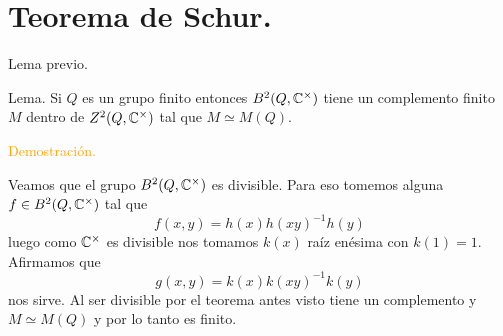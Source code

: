 \documentclass[aspectratio=169, 9pt]{beamer}
\begin{document}
\section[Teorema de Schur.]{Teorema de Schur.}

\begin{frame}[fragile]{Lema previo.}
\begin{alertblock}{Lema.}
Si $Q$ es un grupo finito entonces $B^2(Q, \Bbb C^\times)$ tiene un complemento finito $M$ dentro de $Z^2(Q,\Bbb C^\times)$ tal que $M \simeq M(Q)$.
\end{alertblock}
\textcolor{orange}{Demostración.}

Veamos que el grupo $B^2(Q, \Bbb C^\times)$ es divisible. \pause
Para eso tomemos alguna $f \in B^2(Q,\Bbb C^\times)$ tal que
\[
f(x,y) = h(x)h(xy)^{-1}h(y)
\]
\pause
luego como $\Bbb C^\times$ es divisible nos tomamos $k(x)$ raíz enésima con $k(1)=1$. Afirmamos que 
\[
g(x,y) = k(x)k(xy)^{-1}k(y)
\]
nos sirve. \pause Al ser divisible por el teorema antes visto tiene un complemento y $M \simeq M(Q)$ y por lo tanto es finito.
\end{frame}
\end{document}
